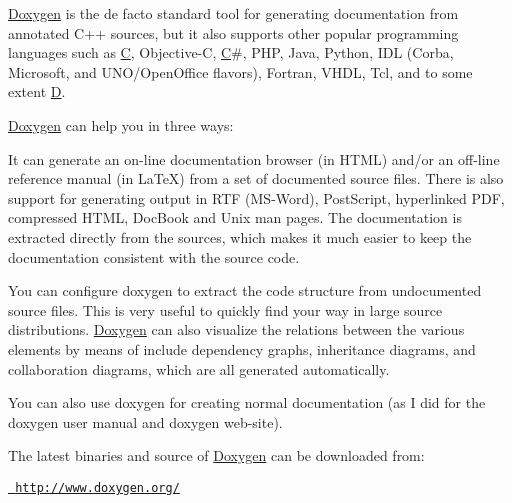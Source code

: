 \mbox{\hyperlink{class_doxygen}{Doxygen}} is the de facto standard tool for generating documentation from annotated C++ sources, but it also supports other popular programming languages such as \mbox{\hyperlink{class_c}{C}}, Objective-\/C, \mbox{\hyperlink{class_c}{C}}\#, P\+HP, Java, Python, I\+DL (Corba, Microsoft, and U\+N\+O/\+Open\+Office flavors), Fortran, V\+H\+DL, Tcl, and to some extent \mbox{\hyperlink{class_d}{D}}.

\mbox{\hyperlink{class_doxygen}{Doxygen}} can help you in three ways\+:


\begin{DoxyEnumerate}
\item It can generate an on-\/line documentation browser (in H\+T\+ML) and/or an off-\/line reference manual (in La\+TeX) from a set of documented source files. There is also support for generating output in R\+TF (M\+S-\/\+Word), Post\+Script, hyperlinked P\+DF, compressed H\+T\+ML, Doc\+Book and Unix man pages. The documentation is extracted directly from the sources, which makes it much easier to keep the documentation consistent with the source code.
\item You can configure doxygen to extract the code structure from undocumented source files. This is very useful to quickly find your way in large source distributions. \mbox{\hyperlink{class_doxygen}{Doxygen}} can also visualize the relations between the various elements by means of include dependency graphs, inheritance diagrams, and collaboration diagrams, which are all generated automatically.
\item You can also use doxygen for creating normal documentation (as I did for the doxygen user manual and doxygen web-\/site).
\end{DoxyEnumerate}

The latest binaries and source of \mbox{\hyperlink{class_doxygen}{Doxygen}} can be downloaded from\+:
\begin{DoxyItemize}
\item \href{http://www.doxygen.org/}{\texttt{ http\+://www.\+doxygen.\+org/}}
\end{DoxyItemize}



